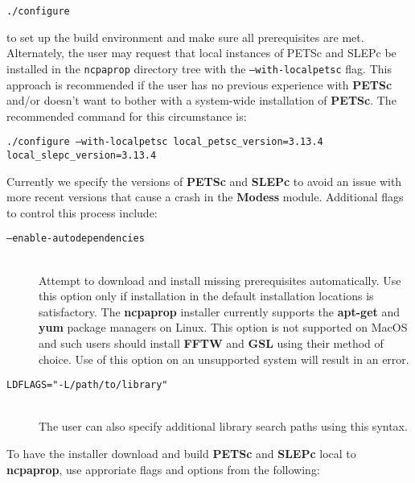\texttt{./configure}

\noindent
to set up the build environment and make sure all prerequisites are met.  Alternately, the user may request that local instances of PETSc and SLEPc be installed in the \texttt{ncpaprop} directory tree with the \texttt{--with-localpetsc} flag.  This approach is recommended if the user has no previous experience with \textbf{PETSc} and/or doesn't want to bother with a system-wide installation of \textbf{PETSc}.  The recommended command for this circumstance is:

\texttt{./configure --with-localpetsc local\_petsc\_version=3.13.4 local\_slepc\_version=3.13.4}

\noindent
Currently we specify the versions of \textbf{PETSc} and \textbf{SLEPc} to avoid an issue with more recent versions that cause a crash in the \textbf{Modess} module.  Additional flags to control this process include:

\begin{description}
\item[\texttt{--enable-autodependencies}]\hfill \\
\noindent
Attempt to download and install missing prerequisites automatically. Use this option only if installation in the default installation locations is satisfactory. The \textbf{ncpaprop} installer currently supports the \textbf{apt-get} and \textbf{yum} package managers on Linux.  This option is not supported on MacOS and such users should install \textbf{FFTW} and \textbf{GSL} using their method of choice.  Use of this option on an unsupported system will result in an error.

\item[\texttt{LDFLAGS="-L/path/to/library"}]\hfill \\
\noindent
The user can also specify additional library search paths using this syntax.
\end{description}

\noindent To have the installer download and build \textbf{PETSc} and \textbf{SLEPc} local to \textbf{ncpaprop}, use approriate flags and options from the following:

